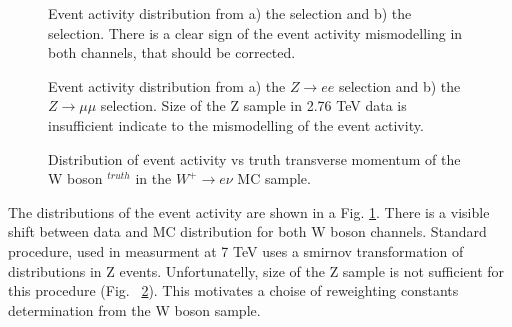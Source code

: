 \begin{figure}[!tbp]
\begin{minipage}[h]{0.49\linewidth}
\end{minipage}
\hfill
\begin{minipage}[h]{0.49\linewidth}
\end{minipage}
\caption{Event activity \sumet distribution from a) the \wenu selection and b) the \wmunu selection. There is a clear sign of the event activity mismodelling in both channels, that should be corrected.}
\label{HadrRecoil:UncorrSumet}
\end{figure}

\begin{figure}[!tbp]
\begin{minipage}[h]{0.5\linewidth}
\end{minipage}
\hfill
\begin{minipage}[h]{0.5\linewidth}
\end{minipage}
\caption{Event activity \sumet distribution from a) the $Z\to ee$ selection and b) the $Z\to \mu\mu$ selection. Size of the Z sample in 2.76 TeV data is insufficient indicate to the mismodelling of the event activity. }
\label{HadronRecoilSumetZ}
\end{figure}

\begin{figure}[!tbp]
\caption{Distribution of event activity \sumet vs truth transverse momentum of the W boson \ptw$^{truth}$ in the $W^{+} \to e\nu$ MC sample.  }
\label{HadrRecoil:SumetPt}
\end{figure}




The distributions of the event activity \sumet  are shown in a Fig. \ref{HadrRecoil:UncorrSumet}. There is a visible shift between data and MC distribution for both W boson channels. Standard procedure, used in \mtw measurment at 7 TeV uses a smirnov transformation of \sumet distributions in Z events. Unfortunatelly, size of the Z sample is not sufficient for this procedure (Fig. ~\ref{HadronRecoilSumetZ}). This motivates a choise of \sumet reweighting constants determination from the W boson sample. 

